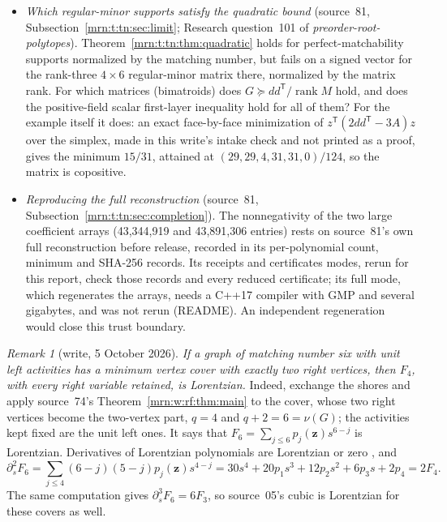 \documentclass[11pt,a4paper]{article}
\theoremstyle{remark}\newtheorem{remark}[theorem]{Remark}
\newcommand{\rank}{\operatorname{rank}}    %
\newcommand{\PSD}{\succeq}                 %
\newcommand{\prp}{\emph{preorder-root-polytopes}}
\begin{document}
\begin{itemize}
  settles covers with exactly two right vertices. Is $F_4$, with every right
  variable retained, Lorentzian for every graph of matching number six with
  unit left activities, also when no minimum cover has two or three right
  vertices (splits $6+0$, $5+1$, $2+4$, $1+5$, $0+6$ written left${}+{}$right)?
\item \emph{Which regular-minor supports satisfy the quadratic bound}
  (source~81, Subsection~\ref{mrn:t:tn:sec:limit}; Research question~101 of
  \prp). Theorem~\ref{mrn:t:tn:thm:quadratic} holds for perfect-matchability
  supports normalized by the matching number, but fails on a signed vector
  for the rank-three $4\times6$ regular-minor matrix there, normalized by
  the matrix rank. For which matrices (bimatroids) does
  $G\PSD dd^{\mathsf T}/\rank M$ hold, and does the positive-field scalar
  first-layer inequality hold for all of them? For the example itself it
  does: an exact face-by-face minimization of
  $z^{\mathsf T}(2dd^{\mathsf T}-3A)z$ over the simplex, made in this
  write's intake check and not printed as a proof, gives the minimum $15/31$,
  attained at $(29,29,4,31,31,0)/124$, so the matrix is copositive.
\item \emph{Reproducing the full reconstruction} (source~81,
  Subsection~\ref{mrn:t:tn:sec:completion}). The nonnegativity of the two
  large coefficient arrays (43,344,919 and 43,891,306 entries) rests on
  source~81's own full reconstruction before release, recorded in its
  per-polynomial count, minimum and SHA-256 records. Its receipts and
  certificates modes, rerun for this report, check those records and every
  reduced certificate; its full mode, which regenerates the arrays, needs a
  C++17 compiler with GMP and several gigabytes, and was not rerun (README).
  An independent regeneration would close this trust boundary.
\end{itemize}

\begin{remark}[write, 5 October 2026]\label{mrn:t:rem:twoshore}
\emph{If a graph of matching number six with unit left activities has a
minimum vertex cover with exactly two right vertices, then $F_4$, with every
right variable retained, is Lorentzian.}
Indeed, exchange the shores and apply source~74's
Theorem~\ref{mrn:w:rf:thm:main} to the cover, whose two right vertices
become the two-vertex part, $q=4$ and $q+2=6=\nu(G)$; the activities kept
fixed are the unit left ones. It says that
$F_6=\sum_{j\le6}p_j(\mathbf z)s^{6-j}$ is Lorentzian. Derivatives of
Lorentzian polynomials are Lorentzian or zero \cite{b:BH}, and
\[
 \partial_s^2F_6=\sum_{j\le4}(6-j)(5-j)p_j(\mathbf z)s^{4-j}
 =30s^4+20p_1s^3+12p_2s^2+6p_3s+2p_4=2F_4 .
\]
The same computation gives $\partial_s^3F_6=6F_3$, so source~05's cubic is
Lorentzian for these covers as well.
\end{remark}
\end{document}

